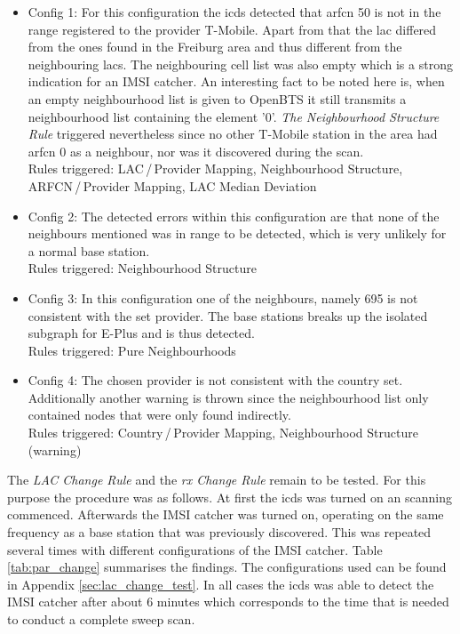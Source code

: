 \begin{itemize}
	\item Config 1: For this configuration the \gls{icds} detected that \gls{arfcn} 50 is not in the range registered to the provider T-Mobile.
	Apart from that the \gls{lac} differed from the ones found in the Freiburg area and thus different from the neighbouring \glspl{lac}.
	The neighbouring cell list was also empty which is a strong indication for an IMSI catcher. 
	An interesting fact to be noted here is, when an empty neighbourhood list is given to OpenBTS it still transmits a neighbourhood list containing the element '0'.
	\emph{The Neighbourhood Structure Rule} triggered nevertheless since no other T-Mobile station in the area had \gls{arfcn} 0 as a neighbour, nor was it discovered during the scan.\\
	Rules triggered: LAC\,/\,Provider Mapping, Neighbourhood Structure, ARFCN\,/\,Provider Mapping, LAC Median Deviation
	\item Config 2: The detected errors within this configuration are that none of the neighbours mentioned was in range to be detected, which is very unlikely for a normal base station.\\
	Rules triggered: Neighbourhood Structure
	\item Config 3: In this configuration one of the neighbours, namely 695 is not consistent with the set provider.
	The base stations breaks up the isolated subgraph for E-Plus and is thus detected.\\
	Rules triggered: Pure Neighbourhoods
	\item Config 4:	The chosen provider is not consistent with the country set.
	Additionally another warning is thrown since the neighbourhood list only contained nodes that were only found indirectly.\\
	Rules triggered: Country\,/\,Provider Mapping, Neighbourhood Structure (warning) 
\end{itemize}
The \emph{LAC Change Rule} and the \emph{rx Change Rule} remain to be tested.
For this purpose the procedure was as follows.
At first the \gls{icds} was turned on an scanning commenced.
Afterwards the IMSI catcher was turned on, operating on the same frequency as a base station that was previously discovered.
This was repeated several times with different configurations of the IMSI catcher.
Table \ref{tab:par_change} summarises the findings.
The configurations used can be found in Appendix \ref{sec:lac_change_test}.
In all cases the \gls{icds} was able to detect the IMSI catcher after about 6 minutes which corresponds to the time that is needed to conduct a complete sweep scan.
